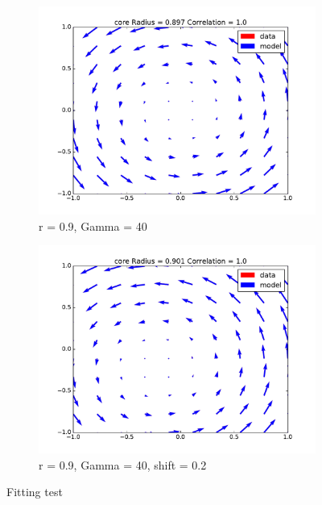 \documentclass[12pt, a4paper, openany]{memoir}
\begin{document}
\begin{figure}[h!]
\begin{subfigure}[b]{0.45\textwidth}
		\includegraphics[trim=40 20 40 20 ,clip, width=\textwidth]{figure/test_09_40.pdf}
		\caption{r = 0.9, Gamma = 40}
	\end{subfigure}
	\begin{subfigure}[b]{0.45\textwidth}
		\centering
		\includegraphics[trim=40 20 40 20 ,clip, width=\textwidth]{figure/test_09_40_02.pdf}
		\caption{r = 0.9, Gamma = 40, shift = 0.2}
	\end{subfigure}
	\caption{Fitting test}
	\label{fig:fittingtests}
\end{figure}
\end{document}
